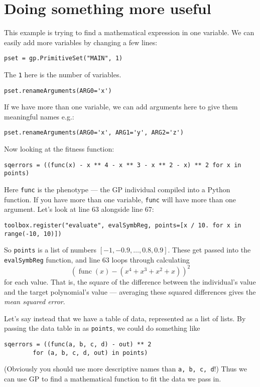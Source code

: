 \documentclass{article}
\begin{document}
\section*{Doing something more useful}

This example is trying to find a mathematical expression in one variable. We can easily add more variables by changing a few lines:
\begin{lstlisting}[firstnumber=37]
    pset = gp.PrimitiveSet("MAIN", 1)
\end{lstlisting}
The \lstinline{1} here is the number of variables.
\begin{lstlisting}[firstnumber=46]
    pset.renameArguments(ARG0='x')
\end{lstlisting}
If we have more than one variable, we can add arguments here to give them meaningful names e.g.:
\begin{lstlisting}[firstnumber=46]
    pset.renameArguments(ARG0='x', ARG1='y', ARG2='z')
\end{lstlisting}
Now looking at the fitness function:
\begin{lstlisting}[firstnumber=63]
    sqerrors = ((func(x) - x ** 4 - x ** 3 - x ** 2 - x) ** 2 for x in points)
\end{lstlisting}
Here \lstinline{func} is the phenotype --- the GP individual compiled into a Python function. If you have more than one variable,
\lstinline{func} will have more than one argument.
Let's look at line 63 alongside line 67:
\begin{lstlisting}[firstnumber=67]
    toolbox.register("evaluate", evalSymbReg, points=[x / 10. for x in range(-10, 10)])
\end{lstlisting}
So \lstinline{points} is a list of numbers $[-1, -0.9, \dots, 0.8, 0.9]$.
These get passed into the \lstinline{evalSymbReg} function, and line 63 loops through calculating
$$
\left( \operatorname{func}(x) - \left( x^4 + x^3 + x^2 + x \right) \right)^2
$$
for each value. That is, the square of the difference between the individual's value and the target polynomial's value ---
averaging these squared differences gives the \emph{mean squared error}.

Let's say instead that we have a table of data, represented as a list of lists. By passing the data table in as \lstinline{points},
we could do something like
\begin{lstlisting}[numbers=none]
    sqerrors = ((func(a, b, c, d) - out) ** 2 
        for (a, b, c, d, out) in points)
\end{lstlisting}
(Obviously you should use more descriptive names than \lstinline{a, b, c, d}!)
Thus we can use GP to find a mathematical function to fit the data we pass in.
\end{document}
